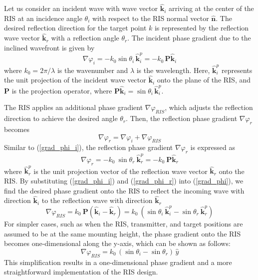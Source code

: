 \documentclass{IEEEoj}
\begin{document}
Let us consider an incident wave with wave vector $\mathbf{\hat{k}}_i$ arriving at the center of the RIS at an incidence angle $\theta_i$ with respect to the RIS normal vector $\mathbf{\hat{n}}$. The desired reflection direction for the target point $k$ is represented by the reflection wave vector $\mathbf{\hat{k}}_r$ with a reflection angle $\theta_r$. The incident phase gradient due to the inclined wavefront is given by
\begin{equation} \label{grad_phi_i}
	\nabla \varphi_i = - k_0 \sin\theta_i \, \mathbf{\hat{k}}_i^p = - k_0 \, \textbf{P} \mathbf{\hat{k}}_i
\end{equation}
where $k_0 = 2 \pi / \lambda$ is the wavenumber and $\lambda$ is the wavelength. Here, $\mathbf{\hat{k}}_i^p$ represents the unit projection of the incident wave vector $\mathbf{\hat{k}}_i$ onto the plane of the RIS, and $\textbf{P}$ is the projection operator, where $\textbf{P} \mathbf{\hat{k}}_i = \sin\theta_i \, \mathbf{\hat{k}}_i^p$.

The RIS applies an additional phase gradient $\nabla \varphi_{RIS}$, which adjusts the reflection direction to achieve the desired angle $\theta_r$. Then, the reflection phase gradient $\nabla \varphi_r$ becomes
\begin{equation} \label{grad_phi}
	\nabla \varphi_r = \nabla \varphi_i + \nabla \varphi_{RIS}
\end{equation}
Similar to (\ref{grad_phi_i}), the reflection phase gradient $\nabla \varphi_r$ is expressed as
\begin{equation} \label{grad_phi_r}
	\nabla \varphi_r = - k_0 \ \sin\theta_r \ \mathbf{\hat{k}}_r^p = - k_0 \ \textbf{P} \mathbf{\hat{k}}_r
\end{equation}
where $\mathbf{\hat{k}}_r^p$ is the unit projection vector of the reflection wave vector \( \mathbf{\hat{k}}_r \) onto the RIS. By substituting (\ref{grad_phi_i}) and (\ref{grad_phi_r}) into (\ref{grad_phi}), we find the desired phase gradient onto the RIS to reflect the incoming wave with direction $\mathbf{\hat{k}}_i$ to the reflection wave with direction $\mathbf{\hat{k}}_r$
\begin{equation} \label{grad_exp}
	\nabla \varphi_{RIS} = k_0 \ \textbf{P} (\mathbf{\hat{k}}_i - \mathbf{\hat{k}}_r) = k_0 \ (\sin\theta_i \ \mathbf{\hat{k}}_i^p - \sin\theta_r \ \mathbf{\hat{k}}_r^p)
\end{equation}
For simpler cases, such as when the RIS, transmitter, and target positions are assumed to be at the same mounting height, the phase gradient onto the RIS becomes one-dimensional along the y-axis, which can be shown as follows:
\begin{equation} \label{grad_exp_simpler}
	\nabla \varphi_{RIS} = k_0 \, (\sin\theta_i - \sin\theta_r) \, \hat{y}
\end{equation}
This simplification results in a one-dimensional phase gradient and a more straightforward implementation of the RIS design.
\end{document}
